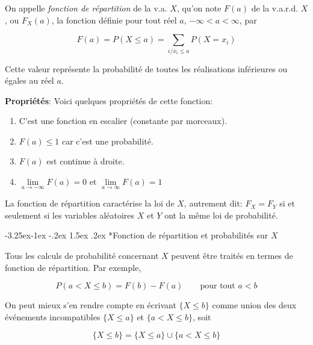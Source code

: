 \documentclass[]{book}
\makeatletter
\renewcommand\subsubsection{\@startsection{subsubsection}{3}{\z@}%
                                     {-3.25ex\@plus -1ex \@minus -.2ex}%
                                     {1.5ex \@plus .2ex}%
                                     {\normalfont\normalsize\bfseries\color{Violet}}}
\theoremstyle{magentacolor}
\theoremstyle{proprie}
\theoremstyle{exstyle}
\theoremstyle{exostyle}
\theoremstyle{definition}
\theoremstyle{definition}
\theoremstyle{definition}
\theoremstyle{remark}
\let\BeginKnitrBlock\begin \let\EndKnitrBlock\end
\makeatother
\begin{document}
\BeginKnitrBlock{definition}
\protect\hypertarget{def:unnamed-chunk-7}{}{\label{def:unnamed-chunk-7} }On appelle \emph{fonction de répartition} de la v.a. \(X\), qu'on note \(F(a)\)
de la v.a.r.d. \(X\), ou \(F_X(a)\), la fonction définie pour tout réel \(a\),
\(-\infty < a < \infty\), par

\[F(a)=P(X \leq a)=\sum_{i / x_{i}\leq a} P(X=x_{i})\]
\EndKnitrBlock{definition}

Cette valeur représente la probabilité de toutes les réalisations
inférieures ou égales au réel \(a\).

\textbf{Propriétés}: Voici quelques propriétés de cette fonction:

\begin{enumerate}
\def\labelenumi{\arabic{enumi}.}
\item
  C'est une fonction en escalier (constante par morceaux).
\item
  \(F(a) \leq 1\) car c'est une probabilité.
\item
  \(F(a)\) est continue à droite.
\item
  \(\lim\limits_{a\to - \infty} F(a) = 0\) et
  \(\lim\limits_{a\to\infty} F(a) = 1\)
\end{enumerate}

La fonction de répartition caractérise la loi de \(X\), autrement dit:
\(F_{X} = F_{Y}\) si et seulement si les variables aléatoires \(X\) et \(Y\)
ont la même loi de probabilité.

\hypertarget{fonction-de-repartition-et-probabilites-sur-x}{%
\subsubsection*{\texorpdfstring{Fonction de répartition et probabilités sur \(X\)}{Fonction de répartition et probabilités sur X}}\label{fonction-de-repartition-et-probabilites-sur-x}}

Tous les calculs de probabilité concernant \(X\) peuvent être traités en
termes de fonction de répartition. Par exemple,

\[P(a < X \leq b) = F(b) - F(a) \quad \quad \text{pour tout } a < b\]

On peut mieux s'en rendre compte en écrivant \(\{X \leq b\}\) comme union
des deux événements incompatibles \(\{X \leq a\}\) et \(\{ a < X \leq b\}\),
soit

\[\{X \leq b\} = \{X \leq a\} \cup   \{ a < X \leq b\}\]
\end{document}
